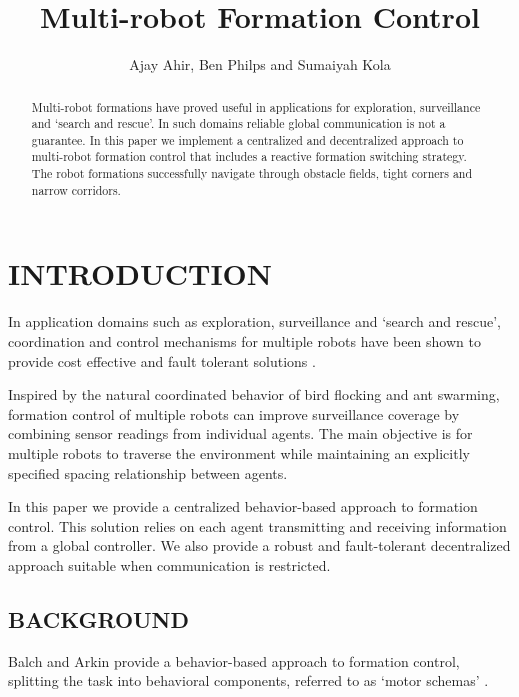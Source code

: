 \documentclass[letterpaper, 10 pt, conference]{ieeeconf}  %
\title{\LARGE \bf Multi-robot Formation Control}
\author{Ajay Ahir, Ben Philps and Sumaiyah Kola}
\begin{document}
\maketitle
\thispagestyle{empty}
\pagestyle{empty}

\begin{abstract}
	
Multi-robot formations have proved useful in applications for exploration, surveillance and `search and rescue'. In such domains reliable global communication is not a guarantee. In this paper we implement a centralized and decentralized approach to multi-robot formation control that includes a reactive formation switching strategy. The robot formations successfully navigate through obstacle fields, tight corners and narrow corridors.

\end{abstract}
	
\section{INTRODUCTION}
	
In application domains such as exploration, surveillance and `search and rescue', coordination and control mechanisms for multiple robots have been shown to provide cost effective and fault tolerant solutions \cite{c1}.

Inspired by the natural coordinated behavior of bird flocking and ant swarming, formation control of multiple robots can improve surveillance coverage by combining sensor readings from individual agents. The main objective is for multiple robots to traverse the environment while maintaining an explicitly specified spacing relationship between agents.

In this paper we provide a centralized behavior-based approach to formation control. This solution relies on each agent transmitting and receiving information from a global controller. We also provide a robust and fault-tolerant decentralized approach suitable when communication is restricted.

\subsection{BACKGROUND}
\label{background}

Balch and Arkin provide a behavior-based approach to formation control, splitting the task into behavioral components, referred to as `motor schemas' \cite{c2}. 
\end{document}
